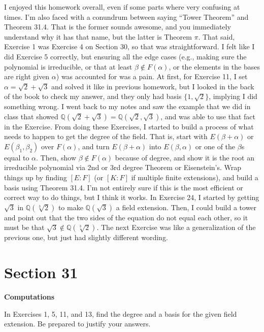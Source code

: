 \documentclass[12pt, oneside]{book}
\newcommand{\Q}{\mathbb{Q}}
\begin{document}
I enjoyed this homework overall, even if some parts where very confusing at times. I'm also faced with a conundrum between saying ``Tower Theorem'' and Theorem 31.4. That is the former sounds awesome, and you immediately understand why it has that name, but the latter is Theorem \(\pi\). That said, Exercise 1 was Exercise 4 on Section 30, so that was straightforward. I felt like I did Exercise 5 correctly, but ensuring all the edge cases (e.g., making sure the polynomial is irreducible, or that at least \(\beta \notin F(\alpha)\), or the elements in the bases are right given \(\alpha\)) was accounted for was a pain. At first, for Exercise 11, I set \(\alpha = \sqrt{2} + \sqrt{3}\) and solved it like in previous homework, but I looked in the back of the book to check my answer, and they only had basis \(\{1, \sqrt{2}\}\), implying I did something wrong. I went back to my notes and saw the example that we did in class that showed \(\Q(\sqrt{2} + \sqrt{3}) = \Q(\sqrt{2},\sqrt{3})\), and was able to use that fact in the Exercise. From doing these Exercises, I started to build a process of what needs to happen to get the degree of the field. That is, start with \(E(\beta + \alpha)\) or \(E(\beta_{1}, \beta_{2})\) over \(F(\alpha)\), and turn \(E(\beta + \alpha)\) into \(E(\beta, \alpha)\) or one of the \(\beta\)s equal to \(\alpha\). Then, show \(\beta \notin F(\alpha)\) because of degree, and show it is the root an irreducible polynomial via 2nd or 3rd degree Theorem or Eisenstein's. Wrap things up by finding \([E : F]\) (or \([K : F]\) if multiple finite extensions), and build a basis using Theorem 31.4. I'm not entirely sure if this is the most efficient or correct way to do things, but I think it works. In Exercise 24, I started by getting \(\sqrt{3}\) in \(\Q(\sqrt[3]{2})\) to make \(\Q(\sqrt{3})\) a field extension. Then, I could build a tower and point out that the two sides of the equation do not equal each other, so it must be that \(\sqrt{3} \notin \Q(\sqrt[3]{2})\). The next Exercise was like a generalization of the previous one, but just had slightly different wording.

\newpage

\section*{Section 31}

\textbf{Computations}

In Exercises 1, 5, 11, and 13, find the degree and a basis for the given field extension. Be prepared to justify your answers. 
\end{document}
